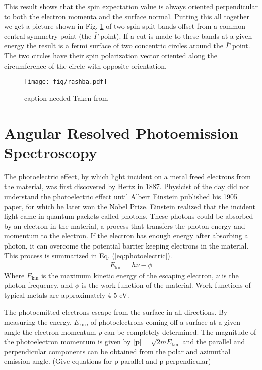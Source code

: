 \documentclass[12pt]{article}
\begin{document}
This result shows that the spin expectation value is always oriented perpendicular to both the electron momenta and the surface normal.
Putting this all together we get a picture shown in Fig. \ref{fig:rashba} of two spin split bands offset from a common central symmetry point (the $\bar{\Gamma}$ point).
If a cut is made to these bands at a given energy the result is a fermi surface of two concentric circles around the $\bar{\Gamma}$ point.
The two circles have their spin polarization vector oriented along the circumference of the circle with opposite orientation.
\begin{figure}[h]
  \centering
  \texttt{[image: fig/rashba.pdf]}
  \caption[should I put this here?]
  {caption needed Taken from \cite{Dil}}
  \label{fig:rashba}
\end{figure}

\section{Angular Resolved Photoemission Spectroscopy}
The photoelectric effect, by which light incident on a metal freed electrons from the material, was first discovered by Hertz in 1887.
Physicist of the day did not understand the photoelectric effect until Albert Einstein published his 1905 paper, for which he later won the Nobel Prize.
Einstein realized that the incident light came in quantum packets called photons.
These photons could be absorbed by an electron in the material, a process that transfers the photon energy and momentum to the electron.
If the electron has enough energy after absorbing a photon, it can overcome the potential barrier keeping electrons in the material.
This process is summarized in Eq. (\ref{eq:photoelectric}).
\begin{align}
  \label{eq:photoelectric}
  E_{\text{kin}}=h\nu-\phi
\end{align}
Where $E_{\text{kin}}$ is the maximum kinetic energy of the escaping electron, $\nu$ is the photon frequency, and $\phi$ is the work function of the material.
Work functions of typical metals are approximately 4-5 eV.

The photoemitted electrons escape from the surface in all directions.
By measuring the energy, $E_{\text{kin}}$, of photoelectrons coming off a surface at a given angle the electron momentum \emph{p} can be completely determined.
The magnitude of the photoelectron momentum is given by $|\boldsymbol{p}|=\sqrt{2mE_{\text{kin}}}$ and the parallel and perpendicular components can be obtained from the polar and azimuthal emission angle.
(Give equations for p parallel and p perpendicular)
\end{document}
